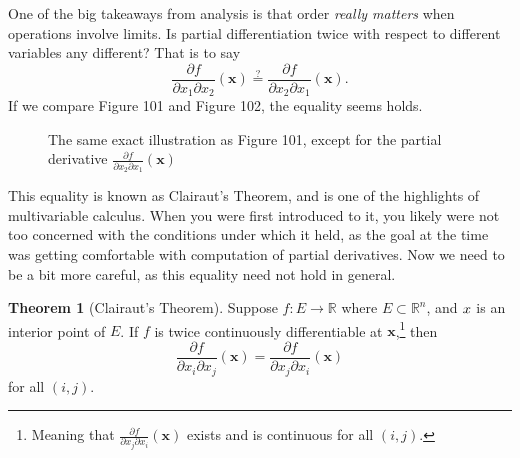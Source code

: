 \documentclass{article}
\newcommand{\R}{\mathbb{R}}
\newcommand{\x}{\mathbf{x}}
\theoremstyle{definition}
\newtheorem{theorem}{Theorem}[section]
\begin{document}
One of the big takeaways from analysis is that order \textit{really matters} when operations involve limits. Is partial differentiation twice with respect to different variables any different? That is to say  $$\frac{\partial f}{\partial x_1\partial x_2}(\x)  \stackrel{?}{=}\frac{\partial f}{\partial x_2\partial x_1}(\x) .$$ If we compare Figure 101 and Figure 102, the equality seems holds. 
\begin{figure}
	\centering
	\caption{The same exact illustration as Figure 101, except for the partial derivative $ \frac{\partial f}{\partial x_2\partial x_1}(\x)$ }
\end{figure}	
This equality is known as Clairaut's Theorem, and is one of the highlights of multivariable calculus. When you were first introduced to it, you likely were not too concerned with the conditions under which it held, as the goal at the time was getting comfortable with computation of partial derivatives. Now we need to be a bit more careful, as this equality need not hold in general.
\begin{theorem}[Clairaut's Theorem]
	Suppose $ f:E\to\R $ where $ E\subset \R^n $, and $ \mathbf \x$ is an interior point of $ E $. If $ f $ is twice continuously differentiable at $ \x $,\footnote{Meaning that $ \frac{\partial f}{\partial x_j\partial x_i}(\x) $ exists and is continuous for all $ (i,j) $. } then $$\frac{\partial f}{\partial x_i\partial x_j}(\x) = \frac{\partial f}{\partial x_j\partial x_i}(\x)$$ for all $ (i,j) $.  
\end{theorem}
\end{document}
